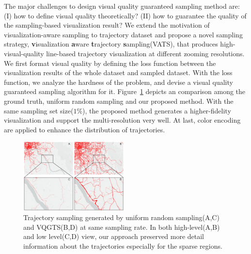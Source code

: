 The major challenges to design visual quality guaranteed sampling method are:
(I) how to define visual quality theoretically? (II) how to guarantee the quality of the sampling-based visualization result?
We extend the motivation of visualization-aware sampling to trajectory dataset and propose a novel sampling strategy, \textbf{v}isualization \textbf{a}ware \textbf{t}rajectory \textbf{s}ampling(VATS), that produces high-visual-quality line-based trajectory visualization at different zooming resolutions. 
We first format visual quality by defining the loss function between the visualization results of the whole dataset and sampled dataset.
With the loss function, we analyze the hardness of the problem, and devise a visual quality guaranteed sampling algorithm for it.
Figure~\ref{fig:compare} depicts an comparison among the ground truth,  uniform random sampling and our proposed method. With the same sampling set size($1\%$), the proposed method generates a higher-fidelity visualization and support the multi-resolution very well.   
At last, color encoding are applied to enhance the distribution of trajectories. 

\begin{figure}[t]
	\centering
	\includegraphics[width=0.49\textwidth]{pictures/introduction/effectiveness.pdf}
	\vspace{-5mm}
	\caption{Trajectory sampling generated by uniform random sampling(A,C) and VQGTS(B,D) at same sampling rate. In both high-level(A,B) and low level(C,D) view, our approach preserved more detail information about the trajectories especially for the sparse regions.}
	\vspace{-5mm}
	\label{fig:compare}
\end{figure}

